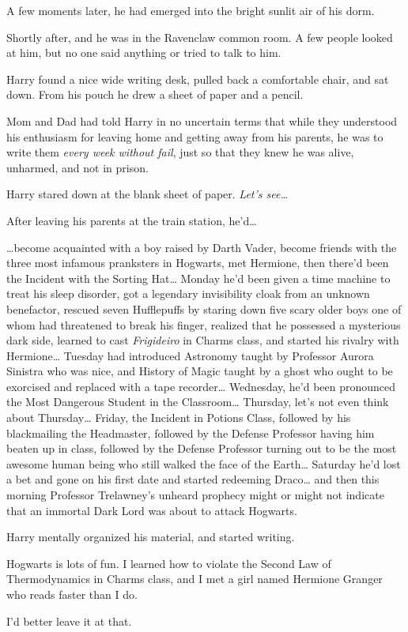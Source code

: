 A few moments later, he had emerged into the bright sunlit air of his dorm.

Shortly after, and he was in the Ravenclaw common room. A few people looked at him, but no one said anything or tried to talk to him.

Harry found a nice wide writing desk, pulled back a comfortable chair, and sat down. From his pouch he drew a sheet of paper and a pencil.

Mom and Dad had told Harry in no uncertain terms that while they understood his enthusiasm for leaving home and getting away from his parents, he was to write them \emph{every week without fail}, just so that they knew he was alive, unharmed, and not in prison.

Harry stared down at the blank sheet of paper. \emph{Let's see{\ldots}}

After leaving his parents at the train station, he'd{\ldots}

{\ldots}become acquainted with a boy raised by Darth Vader, become friends with the three most infamous pranksters in Hogwarts, met Hermione, then there'd been the Incident with the Sorting Hat{\ldots} Monday he'd been given a time machine to treat his sleep disorder, got a legendary invisibility cloak from an unknown benefactor, rescued seven Hufflepuffs by staring down five scary older boys one of whom had threatened to break his finger, realized that he possessed a mysterious dark side, learned to cast \emph{Frigideiro} in Charms class, and started his rivalry with Hermione{\ldots} Tuesday had introduced Astronomy taught by Professor Aurora Sinistra who was nice, and History of Magic taught by a ghost who ought to be exorcised and replaced with a tape recorder{\ldots} Wednesday, he'd been pronounced the Most Dangerous Student in the Classroom{\ldots} Thursday, let's not even think about Thursday{\ldots} Friday, the Incident in Potions Class, followed by his blackmailing the Headmaster, followed by the Defense Professor having him beaten up in class, followed by the Defense Professor turning out to be the most awesome human being who still walked the face of the Earth{\ldots} Saturday he'd lost a bet and gone on his first date and started redeeming Draco{\ldots} and then this morning Professor Trelawney's unheard prophecy might or might not indicate that an immortal Dark Lord was about to attack Hogwarts.

Harry mentally organized his material, and started writing.

\begin{writtenNote}

Hogwarts is lots of fun. I learned how to violate the Second Law of Thermodynamics in Charms class, and I met a girl named Hermione Granger who reads faster than I do.

I'd better leave it at that.

\end{writtenNote}

